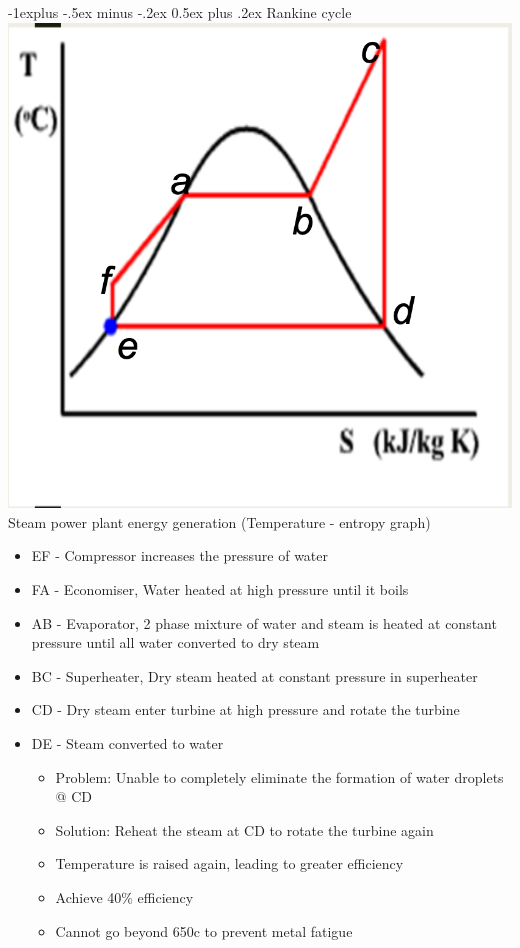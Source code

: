 \documentclass{article}
\makeatletter
\renewcommand{\subsection}{\@startsection{subsection}{2}{0mm}%
    {-1explus -.5ex minus -.2ex}%
    {0.5ex plus .2ex}%
{\normalfont\normalsize\bfseries}}
\makeatother
\begin{document}
\begin{multicols*}{4}
\subsection{Rankine cycle}
\includegraphics[scale=0.3]{rankine_cycle}\\
Steam power plant energy generation (Temperature - entropy graph)
\begin{itemize}
	\item EF - Compressor increases the pressure of water
	\item FA - Economiser, Water heated at high pressure until it boils
	\item AB - Evaporator, 2 phase mixture of water and steam is heated at constant pressure until all water converted to dry steam
	\item BC - Superheater, Dry steam heated at constant pressure in superheater
	\item CD - Dry steam enter turbine at high pressure and rotate the turbine 
	\item DE - Steam converted to water
	\begin{itemize}
		\item Problem: Unable to completely eliminate the formation of water droplets @ CD
		\item Solution: Reheat the steam at CD to rotate the turbine again
		\item Temperature is raised again, leading to greater efficiency
		\item Achieve 40\% efficiency
		\item Cannot go beyond 650c to prevent metal fatigue
	\end{itemize}
\end{itemize}

\end{multicols*}
\end{document}
